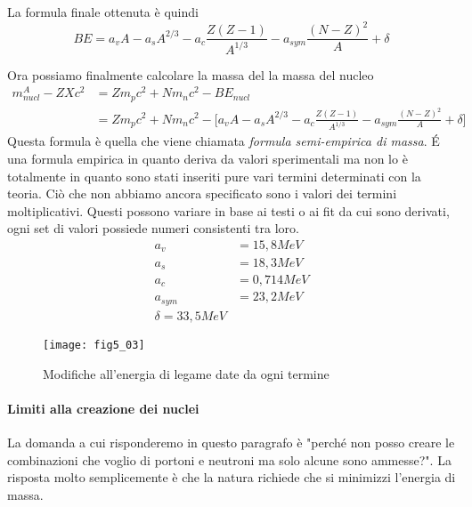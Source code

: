 La formula finale ottenuta è quindi
\begin{equation}
BE=a_vA-a_sA^{2/3}-a_c\frac{Z(Z-1)}{A^{1/3}}-a_{sym}\frac{(N-Z)^2}{A}+\delta
\end{equation}

Ora possiamo finalmente calcolare la massa del la massa del nucleo
\begin{equation}
\begin{split}
m_{nucl} ^A-Z X c^2 &=Z m_p c^2+N m_n c^2- BE_{nucl} \\
&=Zm_pc^2+Nm_nc^2-\biggl[ a_v A-a_s A^{2/3}-a_c \frac{Z(Z-1)}{A^{1/3}}-a_{sym}\frac{(N-Z)^2}{A}+\delta \biggl]
\end{split}
\label{formula_semiempirica_massa}
\end{equation}
Questa formula è quella che viene chiamata \emph{formula semi-empirica di massa}.
\'E una formula empirica in quanto deriva da valori sperimentali ma non lo è totalmente in quanto sono stati inseriti pure vari termini determinati con la teoria.
Ciò che non abbiamo ancora specificato sono i valori dei termini moltiplicativi. 
Questi possono variare in base ai testi o ai fit da cui sono derivati, ogni set di valori possiede numeri consistenti tra loro.
\begin{equation}
\begin{split}
a_v &=15,8MeV\\
a_s&=18,3MeV\\
a_c&=0,714MeV\\
a_{sym}&=23,2MeV\\
\delta=33,5MeV
\end{split}
\end{equation}
\begin{figure}[h]
\centering
\texttt{[image: fig5\_03]}
\caption{Modifiche all'energia di legame date da ogni termine}
\end{figure}

\paragraph{Limiti alla creazione dei nuclei}
La domanda a cui risponderemo in questo paragrafo è "perché non posso creare le combinazioni che voglio di portoni e neutroni ma solo alcune sono ammesse?".
La risposta molto semplicemente è che la natura richiede che si minimizzi l'energia di massa.

